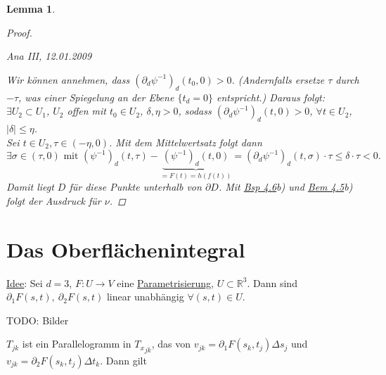 \documentclass[a4paper]{report}
\newcommand{\R}{\mathbb{R}}
\newcommand{\jlabel}[1]{\label{j_#1}}
\newcommand{\jhyperref}[2]{\hyperref[j_#1]{#2}}
\newcommand{\jlink}[1]{\jhyperref{#1}{#1}}
\newcommand{\jabb}[3]{ #1: #2 \rightarrow #3 }
\newcommand{\jspace}{\vspace{8pt}}
\newcommand{\jspacesmall}{\vspace{4pt}}
\newcommand{\jdate}[1]{\jspacesmall\begin{center}\jlabel{#1}\tiny{Ana III, #1}\end{center}}
\theoremstyle{plain}
\newtheorem{lem}[thm]{Lemma}
\theoremstyle{definition}
\begin{document}
{{{{\begin{lem}
\begin{proof}
\jdate{12.01.2009}
        
        Wir können annehmen, dass $(\partial_d \psi^{-1})_d(t_0,0)>0$. (Andernfalls ersetze $\tau$ durch $-\tau$, was einer Spiegelung an der Ebene $\{t_d=0\}$ entspricht.) Daraus folgt: $\exists U_2\subset U_1$, $U_2$ offen mit $t_0\in U_2$, $\delta, \eta>0$, sodass $(\partial_d \psi^{-1})_d(t,0) > 0$, $\forall t \in U_2$, $|\delta| \le \eta$.\\
        Sei $t\in U_2, \tau \in (-\eta, 0)$. Mit dem Mittelwertsatz folgt dann
        \[
            \exists \sigma \in (\tau,0) \text{ mit } (\psi^{-1})_d(t,\tau) - \underbrace{(\psi^{-1})_d(t,0)}_{=F(t)=h(f(t))} = (\partial_d \psi^{-1})_d(t,\sigma)\cdot \tau \le \delta \cdot \tau < 0.
        \]
        Damit liegt $D$ für diese Punkte unterhalb von $\partial D$. Mit \jlink{Bsp 4.6}b) und \jlink{Bem 4.5}b) folgt der Ausdruck für $\nu$.
    \end{proof}
\end{lem}

        

\section{Das Oberflächenintegral}

\uline{Idee}: Sei $d=3$, $\jabb{F}{U}{V}$ eine \jlink{Parametrisierung}, $U\subset \R^3$. Dann sind $\partial_1 F(s,t), \ \partial_2 F(s,t)$ linear unabhängig $\forall (s,t)\in U$.

\jspace

TODO: Bilder

\jspace

$T_{jk}$ ist ein Parallelogramm in ${T_x}_{jk}$, das von $v_{jk} = \partial_1 F(s_k,t_j)\Delta s_j$ und $v_{jk} = \partial_2 F(s_k,t_j)\Delta t_k$. Dann gilt

}}}}
\end{document}
